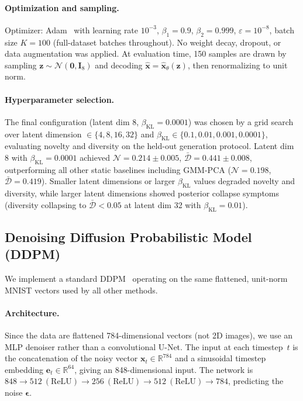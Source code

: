 \paragraph{Optimization and sampling.}
Optimizer: Adam~\cite{kingmaAdamMethodStochastic2014} with learning rate $10^{-3}$,
$\beta_1{=}0.9$, $\beta_2{=}0.999$, $\varepsilon{=}10^{-8}$, batch size $K{=}100$
(full-dataset batches throughout).
No weight decay, dropout, or data augmentation was applied.
At evaluation time, 150 samples are drawn by sampling
$\mathbf{z}\sim\mathcal{N}(\mathbf{0},\mathbf{I}_8)$ and decoding
$\hat{\mathbf{x}}=\hat{\mathbf{x}}_\theta(\mathbf{z})$, then renormalizing to unit norm.

\paragraph{Hyperparameter selection.}
The final configuration (latent dim 8, $\beta_{\mathrm{KL}}{=}0.0001$) was chosen by a
grid search over latent dimension $\in\{4,8,16,32\}$ and $\beta_{\mathrm{KL}}\in\{0.1,0.01,0.001,0.0001\}$,
evaluating novelty and diversity on the held-out generation protocol.
Latent dim 8 with $\beta_{\mathrm{KL}}{=}0.0001$ achieved $\mathcal{N}{=}0.214\pm0.005$,
$\bar{\mathcal{D}}{=}0.441\pm0.008$, outperforming all other static baselines including
GMM-PCA ($\mathcal{N}{=}0.198$, $\bar{\mathcal{D}}{=}0.419$).
Smaller latent dimensions or larger $\beta_{\mathrm{KL}}$ values degraded novelty and
diversity, while larger latent dimensions showed posterior collapse symptoms
(diversity collapsing to $\bar{\mathcal{D}}{<}0.05$ at latent dim 32 with $\beta_{\mathrm{KL}}{=}0.01$).

\subsection{Denoising Diffusion Probabilistic Model (DDPM)}\label{app:ddpm}

We implement a standard DDPM~\cite{hoDenoisingDiffusionProbabilistic2020} operating on the
same flattened, unit-norm MNIST vectors used by all other methods.

\paragraph{Architecture.}
Since the data are flattened 784-dimensional vectors (not 2D images), we use an MLP denoiser
rather than a convolutional U-Net. The input at each timestep~$t$ is the concatenation of the
noisy vector $\mathbf{x}_t\in\mathbb{R}^{784}$ and a sinusoidal timestep embedding
$\mathbf{e}_t\in\mathbb{R}^{64}$, giving an 848-dimensional input. The network is
$848\to512~(\mathrm{ReLU})\to256~(\mathrm{ReLU})\to512~(\mathrm{ReLU})\to784$,
predicting the noise $\boldsymbol{\epsilon}$.


